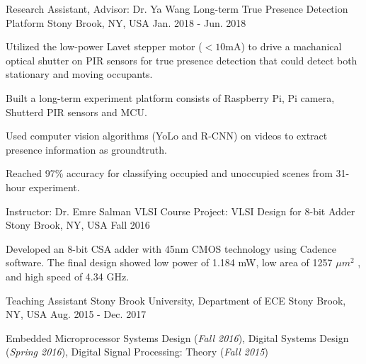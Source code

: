 \begin{cventries}
  \cventry
    {Research Assistant, Advisor: Dr. Ya Wang} %
    {Long-term True Presence Detection Platform} %
    {Stony Brook, NY, USA} %
    {Jan. 2018 - Jun. 2018} %
    {
      \begin{cvitems} %
        \item Utilized the low-power Lavet stepper motor ($<10$mA) to drive a machanical optical shutter on PIR 
        sensors for true presence detection that could detect both stationary and moving occupants.
        \item Built a long-term experiment platform consists of Raspberry Pi, Pi camera, Shutterd PIR sensors and MCU.
        \item Used computer vision algorithms (YoLo and R-CNN) on videos to extract presence information as groundtruth.
        \item Reached 97\% accuracy for classifying occupied and unoccupied scenes from 31-hour experiment.
      \end{cvitems}
    }

    \cventry
    {Instructor: Dr. Emre Salman} %
    {VLSI Course Project: VLSI Design for 8-bit Adder} %
    {Stony Brook, NY, USA} %
    {Fall 2016} %
    {
      \begin{cvitems} %
        \item Developed an 8-bit CSA adder with 45nm CMOS technology using Cadence 
        software. The final design showed low power of
        1.184 mW, low area of 1257 \(\mu m^2\) , and high speed of 4.34 GHz.
      \end{cvitems}
    }

  \cventry
    {Teaching Assistant} %
    {Stony Brook University, Department of ECE} %
    {Stony Brook, NY, USA} %
    {Aug. 2015 - Dec. 2017} %
    {
      \begin{cvitems} %
        \item Embedded Microprocessor Systems Design (\textit{Fall 2016}), Digital Systems Design (\textit{Spring 2016}), Digital Signal Processing: Theory (\textit{Fall 2015}) 
      \end{cvitems}
    }

\end{cventries}
